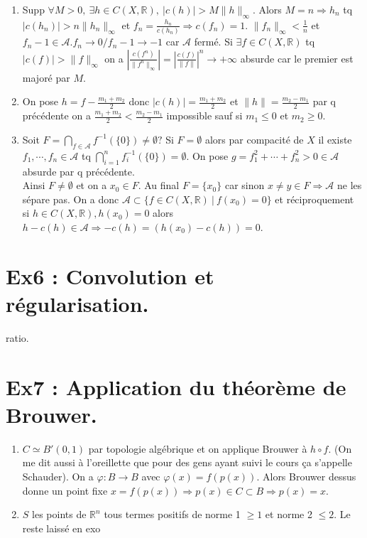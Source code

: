 \documentclass[a4paper]{article}
\begin{document}
\begin{enumerate}
    \item Supp $\forall M>0,\ \exists h\in C(X,\mathbb{R} ),\ |c(h)| > M\|h\|_\infty . $ Alors $M=n\Rightarrow h_n$ tq $|c(h_n)| > n\|h_n\|_\infty $ et $f_n=\frac{h_n}{c(h_n)}\Rightarrow c(f_n)=1$. $\|f_n\|_\infty <\frac{1}{n}$  et $f_n-1\in \mathcal{A}. f_n\to 0/f_n-1\to -1 $ car $\mathcal{A}$ fermé. Si $\exists f\in C(X,\mathbb{R} )$ tq $|c(f)| >\|f\|_\infty $ on a $|\frac{c(f^n)}{\|f^n\|_\infty }|=|\frac{c(f)}{\|f\|}| ^n\to +\infty  $ absurde car le premier est majoré par $M.$
    \item On pose  $h=f-\frac{m_1+m_2}{2}$ donc $|c(h)|=\frac{m_1+m_2}{2}$ et $\|h\|=\frac{m_2-m_1}{2}$ par q précédente on a  $\frac{m_1+m_2}{2}<\frac{m_2-m_1}{2}$ impossible sauf si $m_1\le 0$ et $m_2\ge 0$.
    \item Soit $F=\bigcap\limits_{f\in \mathcal{A}} f^{-1} (\{0\} )\neq \emptyset ?$ Si $F=\emptyset $ alors par compacité de $X$ il existe $f_1,\cdots,f_n\in \mathcal{A}$ tq $\bigcap\limits_{i=1}^nf_i^{-1} (\{0\} )=\emptyset . $ On pose $g=f_1^2+\cdots+f_n^2>0\in \mathcal{A}$ absurde par q précédente. \\
        Ainsi $F\neq \emptyset $ et on a $x_0\in F.$ Au final $F=\{x_0\} $ car sinon $x\neq y\in F\Rightarrow \mathcal{A}$ ne les sépare pas. On a donc $\mathcal{A}\subset \{f\in C(X,\mathbb{R} )\ |\ f(x_0)=0\} $ et réciproquement si $h\in C(X,\mathbb{R} ), h(x_0)=0$ alors $h-c(h)\in \mathcal{A}\Rightarrow -c(h)=\left( h(x_0)-c(h) \right) =0$.
\end{enumerate}

\section*{Ex6 : Convolution et régularisation.}
ratio.
\section*{Ex7 : Application du théorème de Brouwer.}
\begin{enumerate}
    \item $C\simeq B'(0,1)$ par topologie algébrique et on applique Brouwer à $h\circ f$. (On me dit aussi à l'oreillette que pour des gens ayant suivi le cours ça s'appelle Schauder). On a $\varphi :B\to B$ avec $\varphi (x)=f(p(x)).$ Alors Brouwer dessus donne un point fixe $x=f(p(x))\Rightarrow p(x)\in C\subset B\Rightarrow p(x)=x$.
    \item $S$ les points de $\mathbb{R} ^n$ tous termes positifs de norme 1 $\ge 1$ et norme 2 $\le 2$. Le reste laissé en exo
\end{enumerate}
\end{document}
